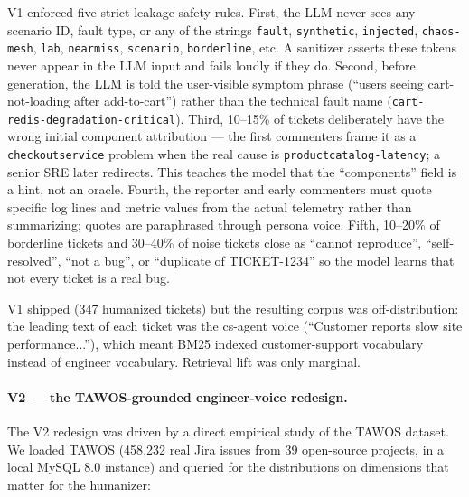 V1 enforced five strict leakage-safety rules. First, the LLM never sees any scenario ID, fault type, or any of the strings \texttt{fault}, \texttt{synthetic}, \texttt{injected}, \texttt{chaos-mesh}, \texttt{lab}, \texttt{nearmiss}, \texttt{scenario}, \texttt{borderline}, etc. A sanitizer asserts these tokens never appear in the LLM input and fails loudly if they do. Second, before generation, the LLM is told the user-visible symptom phrase (``users seeing cart-not-loading after add-to-cart'') rather than the technical fault name (\texttt{cart-redis-degradation-critical}). Third, 10--15\% of tickets deliberately have the wrong initial component attribution --- the first commenters frame it as a \texttt{checkoutservice} problem when the real cause is \texttt{productcatalog-latency}; a senior SRE later redirects. This teaches the model that the ``components'' field is a hint, not an oracle. Fourth, the reporter and early commenters must quote specific log lines and metric values from the actual telemetry rather than summarizing; quotes are paraphrased through persona voice. Fifth, 10--20\% of borderline tickets and 30--40\% of noise tickets close as ``cannot reproduce'', ``self-resolved'', ``not a bug'', or ``duplicate of TICKET-1234'' so the model learns that not every ticket is a real bug.

V1 shipped (347 humanized tickets) but the resulting corpus was off-distribution: the leading text of each ticket was the cs-agent voice (``Customer reports slow site performance...''), which meant BM25 indexed customer-support vocabulary instead of engineer vocabulary. Retrieval lift was only marginal.

\paragraph{V2 --- the TAWOS-grounded engineer-voice redesign.}

The V2 redesign was driven by a direct empirical study of the TAWOS dataset. We loaded TAWOS (458{,}232 real Jira issues from 39 open-source projects, in a local MySQL 8.0 instance) and queried for the distributions on dimensions that matter for the humanizer:

